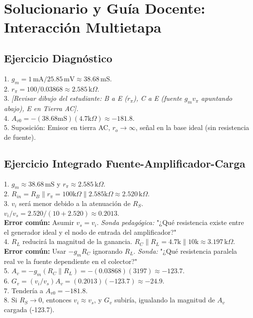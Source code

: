\documentclass[11pt, a4paper]{article}
\begin{document}
\section*{Solucionario y Guía Docente: Interacción Multietapa}

\subsection*{Ejercicio Diagnóstico}
1. $g_m = 1\,\text{mA} / 25.85\,\text{mV} \approx 38.68\,\text{mS}$. \\
2. $r_\pi = 100 / 0.03868 \approx 2.585\,\text{k}\Omega$. \\
3. \textit{[Revisar dibujo del estudiante: B a E ($r_\pi$), C a E (fuente $g_m v_\pi$ apuntando abajo), E en Tierra AC].} \\
4. $A_{v0} = -(38.68\text{mS})(4.7\text{k}\Omega) \approx -181.8$. \\
5. Suposición: Emisor en tierra AC, $r_o \to \infty$, señal en la base ideal (sin resistencia de fuente).

\subsection*{Ejercicio Integrado Fuente-Amplificador-Carga}
1. $g_m \approx 38.68\,\text{mS}$ y $r_\pi \approx 2.585\,\text{k}\Omega$. \\
2. $R_{in} = R_B \parallel r_\pi = 100\text{k}\Omega \parallel 2.585\text{k}\Omega \approx 2.520\,\text{k}\Omega$. \\
3. $v_i$ será menor debido a la atenuación de $R_S$. $v_i/v_s = 2.520 / (10 + 2.520) \approx 0.2013$. \\
\textbf{Error común:} Asumir $v_s = v_i$. \textit{Sonda pedagógica:} "¿Qué resistencia existe entre el generador ideal y el nodo de entrada del amplificador?" \\
4. $R_L$ reducirá la magnitud de la ganancia. $R_C \parallel R_L = 4.7\text{k} \parallel 10\text{k} \approx 3.197\,\text{k}\Omega$. \\
\textbf{Error común:} Usar $-g_m R_C$ ignorando $R_L$. \textit{Sonda:} "¿Qué resistencia paralela real ve la fuente dependiente en el colector?" \\
5. $A_v = -g_m (R_C \parallel R_L) = -(0.03868)(3197) \approx -123.7$. \\
6. $G_v = (v_i/v_s) A_v = (0.2013)(-123.7) \approx -24.9$. \\
7. Tendería a $A_{v0} = -181.8$. \\
8. Si $R_S \to 0$, entonces $v_i \approx v_s$, y $G_v$ subiría, igualando la magnitud de $A_v$ cargada (-123.7).
\end{document}
